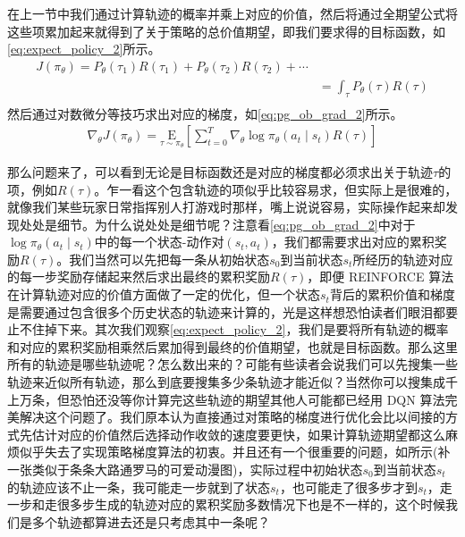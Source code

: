 在上一节中我们通过计算轨迹的概率并乘上对应的价值，然后将通过全期望公式将这些项累加起来就得到了关于策略的总价值期望，即我们要求得的目标函数，如\eqref{eq:expect_policy_2}所示。
\begin{equation}
    \label{eq:expect_policy_2}
    \begin{aligned}
    J(\pi_{\theta}) = P_{\theta}(\tau_{1})R(\tau_{1})+P_{\theta}(\tau_{2})R(\tau_{2})+\cdots \\
    &=\int_\tau P_{\theta}(\tau) R(\tau) \\ 
\end{aligned}
\end{equation}
然后通过对数微分等技巧求出对应的梯度，如\eqref{eq:pg_ob_grad_2}所示。
\begin{equation}
    \label{eq:pg_ob_grad_2}
    \begin{aligned}
    \nabla_\theta J\left(\pi_\theta\right) = \underset{\tau \sim \pi_\theta}{\mathrm{E}}\left[\sum_{t=0}^T \nabla_\theta \log \pi_\theta\left(a_t \mid s_t\right) R(\tau)\right]
    \end{aligned}
\end{equation}

那么问题来了，可以看到无论是目标函数还是对应的梯度都必须求出关于轨迹$\tau$的项，例如$R(\tau)$。乍一看这个包含轨迹的项似乎比较容易求，但实际上是很难的，就像我们某些玩家日常指挥别人打游戏时那样，嘴上说说容易，实际操作起来却发现处处是细节。为什么说处处是细节呢？注意看\eqref{eq:pg_ob_grad_2}中对于$\log \pi_\theta\left(a_t \mid s_t\right)$中的每一个状态-动作对$(s_t,a_t)$，我们都需要求出对应的累积奖励$R(\tau)$。我们当然可以先把每一条从初始状态$s_0$到当前状态$s_t$所经历的轨迹对应的每一步奖励存储起来然后求出最终的累积奖励$R(\tau)$，即便 REINFORCE 算法在计算轨迹对应的价值方面做了一定的优化，但一个状态$s_t$背后的累积价值和梯度是需要通过包含很多个历史状态的轨迹来计算的，光是这样想恐怕读者们眼泪都要止不住掉下来。其次我们观察\eqref{eq:expect_policy_2}，我们是要将所有轨迹的概率和对应的累积奖励相乘然后累加得到最终的价值期望，也就是目标函数。那么这里所有的轨迹是哪些轨迹呢？怎么数出来的？可能有些读者会说我们可以先搜集一些轨迹来近似所有轨迹，那么到底要搜集多少条轨迹才能近似？当然你可以搜集成千上万条，但恐怕还没等你计算完这些轨迹的期望其他人可能都已经用 DQN 算法完美解决这个问题了。我们原本认为直接通过对策略的梯度进行优化会比以间接的方式先估计对应的价值然后选择动作收敛的速度要更快，如果计算轨迹期望都这么麻烦似乎失去了实现策略梯度算法的初衷。并且还有一个很重要的问题，如所示(补一张类似于条条大路通罗马的可爱动漫图)，实际过程中初始状态$s_0$到当前状态$s_t$的轨迹应该不止一条，我可能走一步就到了状态$s_t$，也可能走了很多步才到$s_t$，走一步和走很多步生成的轨迹对应的累积奖励多数情况下也是不一样的，这个时候我们是多个轨迹都算进去还是只考虑其中一条呢？

